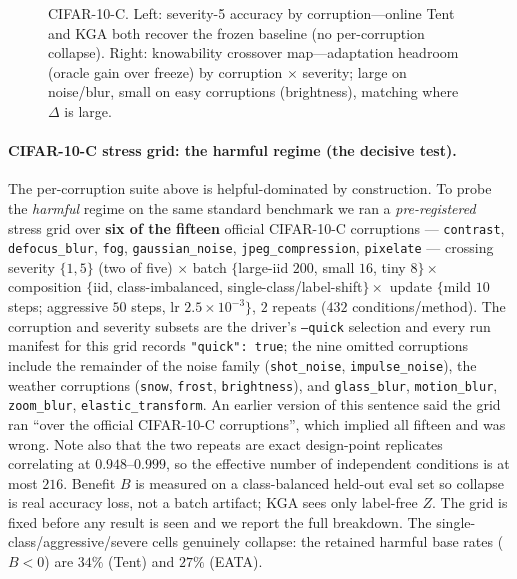 \documentclass[conference]{IEEEtran}
\theoremstyle{plain}
\theoremstyle{definition}
\begin{document}
\begin{figure}[tb]\centering
{}\hfill
{}
\caption{CIFAR-10-C. Left: severity-5 accuracy by corruption---online Tent and \textsc{KGA}
both recover the frozen baseline (no per-corruption collapse). Right: knowability crossover
map---adaptation headroom (oracle gain over freeze) by corruption $\times$ severity; large
on noise/blur, small on easy corruptions (brightness), matching where $\Delta$ is large.}
\label{fig:c10c}
\end{figure}

\paragraph{CIFAR-10-C stress grid: the harmful regime (the decisive test).}
The per-corruption suite above is helpful-dominated by construction. To probe the
\emph{harmful} regime on the same standard benchmark we ran a \emph{pre-registered} stress
grid over \textbf{six of the fifteen} official CIFAR-10-C corruptions ---
\texttt{contrast}, \texttt{defocus\_blur}, \texttt{fog}, \texttt{gaussian\_noise},
\texttt{jpeg\_compression}, \texttt{pixelate} --- crossing severity $\{1,5\}$ (two of five)
$\times$ batch
$\{$large-iid $200$, small $16$, tiny $8\}\times$ composition $\{$iid, class-imbalanced,
single-class/label-shift$\}\times$ update $\{$mild $10$ steps; aggressive $50$ steps,
lr $2.5{\times}10^{-3}\}$, $2$ repeats ($432$ conditions/method). The corruption and severity
subsets are the driver's \texttt{--quick} selection and every run manifest for this grid records
\texttt{"quick": true}; the nine omitted corruptions include the remainder of the noise family
(\texttt{shot\_noise}, \texttt{impulse\_noise}), the weather corruptions (\texttt{snow},
\texttt{frost}, \texttt{brightness}), and \texttt{glass\_blur}, \texttt{motion\_blur},
\texttt{zoom\_blur}, \texttt{elastic\_transform}. An earlier version of this sentence said the grid
ran ``over the official CIFAR-10-C corruptions'', which implied all fifteen and was wrong.
Note also that the two repeats are exact design-point replicates correlating at $0.948$--$0.999$,
so the effective number of independent conditions is at most $216$.
Benefit $B$ is measured on
a class-balanced held-out eval set so collapse is real accuracy loss, not a batch artifact;
\textsc{KGA} sees only label-free $Z$. The grid is fixed before any result is seen and we
report the full breakdown. The single-class/aggressive/severe cells genuinely collapse:
the retained harmful base rates ($B{<}0$) are $34\%$ (Tent) and $27\%$ (EATA).
\end{document}
